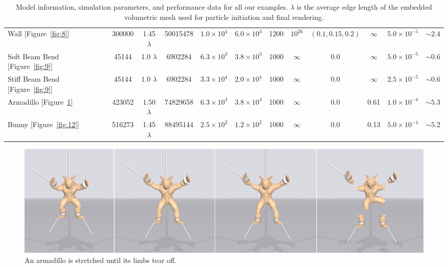 \begin{table}[htb]
{\begin{tabular}{lccccccccccc}
  Wall [Figure~\ref{fig:8}]         & 300000 & 1.45$\lambda$ & 50015478 & $1.0\times10^{4}$ & $6.0\times10^{3}$        & 1200 & $10^{26}$ &$(0.1,0.15,0.2)$ &$\infty$  & $5.0\times10^{-5}$   & $\sim2.4$ \\
  Soft Beam Bend [Figure~\ref{fig:9}] & 45144  & 1.0 $\lambda$ & 6902284  & $6.3\times10^3$   & $3.8\times10^3$          & 1000 & $\infty $ & 0.0             & $\infty$ & $5.0\times10^{-5}$   & $\sim0.6$ \\
  Stiff Beam Bend [Figure~\ref{fig:9}] & 45144  & 1.0 $\lambda$ & 6902284  & $3.3\times10^4$   & $2.0\times10^4$          & 1000 & $\infty $ & 0.0             & $\infty$ & $2.5\times10^{-5}$ & $\sim0.6$ \\
  Armadillo [Figure~\ref{fig:10}]     & 423052 & 1.50$\lambda$ & 74829658 & $6.3\times10^4$   & $3.8\times10^4$          & 1000 & $\infty $ & 0.0             & 0.61     & $1.0\times10^{-4}$          & $\sim5.3$ \\
  Bunny [Figure~\ref{fig:12}]        & 516273 & 1.45$\lambda$ & 88495144 & $2.5\times10^2$   & $1.2\times10^2$          & 1000 & $\infty $ & 0.0             & 0.13     & $5.0\times10^{-4}$   & $\sim5.2$ \\
  \hline
\end{tabular}
}
\label{tab:1}
\caption{Model information, simulation parameters, and performance data for all our examples. $\lambda$ is the average edge length of the embedded volumetric mesh used for particle initiation and final rendering.}
\end{table}

\begin{figure}[t]
  \centering
  \includegraphics[width=\linewidth]{./figs/demo_tear_armadillo.png}
  \caption{\label{fig:10}
  An armadillo is stretched until its limbs tear off.
}
\end{figure}

